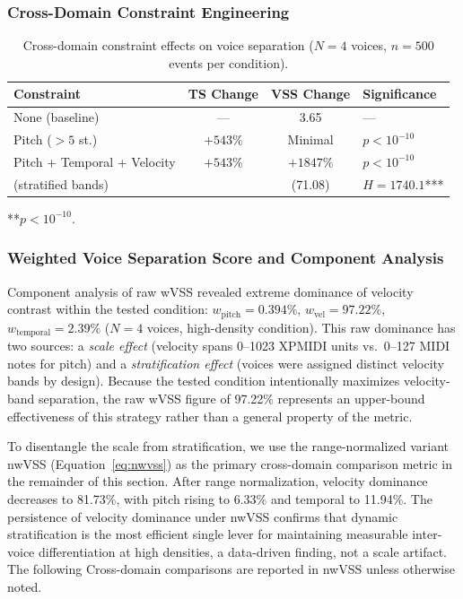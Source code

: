 \documentclass[a4paper]{article}
\newcommand{\tbl}[2]{\caption{#1}\centering#2}
\newcommand{\tabnote}[1]{\par\vspace{0.5ex}\footnotesize#1}
\theoremstyle{definition}
\theoremstyle{remark}
\begin{document}
\subsubsection{Cross-Domain Constraint Engineering}

\begin{table}[htbp]
\tbl{Cross-domain constraint effects on voice separation ($N = 4$ voices, $n = 500$ events per condition).}
{\begin{tabular}{@{}lccl@{}} \toprule
\textbf{Constraint} & \textbf{TS Change} & \textbf{VSS Change} & \textbf{Significance} \\ \midrule
None (baseline) & --- & 3.65 & --- \\
Pitch ($> 5$ st.) & $+543\%$ & Minimal & $p < 10^{-10}$ \\
Pitch + Temporal + Velocity & $+543\%$ & $+1847\%$ & $p < 10^{-10}$ \\
\quad (stratified bands) & & (71.08) & $H = 1740.1$*** \\ \bottomrule
\end{tabular}}
\tabnote{***$p < 10^{-10}$.}
\label{tab:constraints_results}
\end{table}

\subsubsection{Weighted Voice Separation Score and Component Analysis}
\label{sec:wvss_validation}

Component analysis of raw wVSS revealed extreme dominance of velocity contrast within the tested condition: $w_{\text{pitch}} = 0.394\%$, $w_{\text{vel}} = 97.22\%$, $w_{\text{temporal}} = 2.39\%$ ($N = 4$ voices, high-density condition). This raw dominance has two sources: a \emph{scale effect} (velocity spans 0--1023 XPMIDI units vs.\ 0--127 MIDI notes for pitch) and a \emph{stratification effect} (voices were assigned distinct velocity bands by design). Because the tested condition intentionally maximizes velocity-band separation, the raw wVSS figure of 97.22\% represents an upper-bound effectiveness of this strategy rather than a general property of the metric.

To disentangle the scale from stratification, we use the range-normalized variant nwVSS (Equation~\ref{eq:nwvss}) as the primary cross-domain comparison metric in the remainder of this section. After range normalization, velocity dominance decreases to 81.73\%, with pitch rising to 6.33\% and temporal to 11.94\%. The persistence of velocity dominance under nwVSS confirms that dynamic stratification is the most efficient single lever for maintaining measurable inter-voice differentiation at high densities, a data-driven finding, not a scale artifact. The following Cross-domain comparisons are reported in nwVSS unless otherwise noted.
\end{document}
